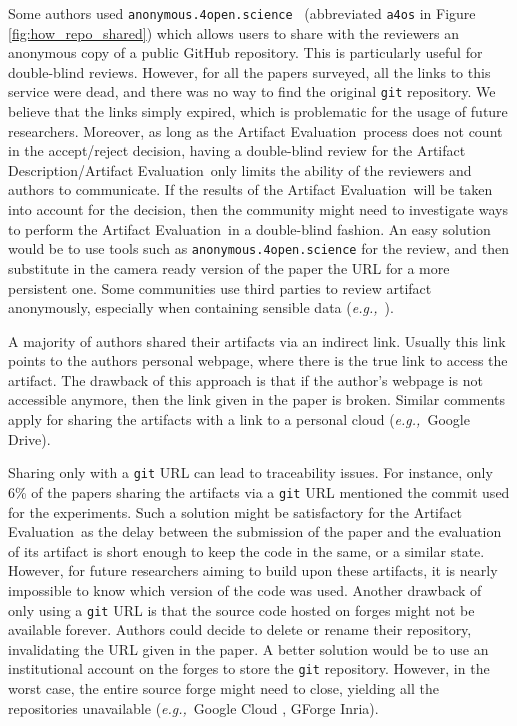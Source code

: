 \documentclass[sigconf,natbib=false]{acmart}
\newcommand{\eg}{\emph{e.g.,}}
\newcommand{\ad}{Artifact Description}
\newcommand{\aeval}{Artifact Evaluation}
\newcommand{\adae}{\ad/\aeval}
\begin{document}
Some authors used \texttt{anonymous.4open.science}\ \cite{anonymous_github} (abbreviated \texttt{a4os} in Figure \ref{fig:how_repo_shared}) which allows users to share with the reviewers an anonymous copy of a public GitHub repository.
This is particularly useful for double-blind reviews.
However, for all the papers surveyed, all the links to this service were dead, and there was no way to find the original \texttt{git} repository.
We believe that the links simply expired, which is problematic for the usage of future researchers.
Moreover, as long as the \aeval\ process does not count in the accept/reject decision, having a double-blind review for the \adae\ only limits the ability of the reviewers and authors to communicate.
If the results of the \aeval\ will be taken into account for the decision, then the community might need to investigate ways to perform the \aeval\ in a double-blind fashion.
An easy solution would be to use tools such as \texttt{anonymous.4open.science} \cite{anonymous_github} for the review, and then substitute in the camera ready version of the paper the URL for a more persistent one.
Some communities use third parties to review artifact anonymously, especially when containing sensible data (\eg\ \cite{perignon2019certify}).

A majority of authors shared their artifacts via an indirect link.
Usually this link points to the authors personal webpage, where there is the true link to access the artifact.
The drawback of this approach is that if the author's webpage is not accessible anymore, then the link given in the paper is broken.
Similar comments apply for sharing the artifacts with a link to a personal cloud (\eg\ Google Drive).

Sharing only with a \texttt{git} URL can lead to traceability issues.
For instance, only 6\% of the papers sharing the artifacts via a \texttt{git} URL mentioned the commit used for the experiments.
Such a solution might be satisfactory for the \aeval\ as the delay between the submission of the paper and the evaluation of its artifact is short enough to keep the code in the same, or a similar state.
However, for future researchers aiming to build upon these artifacts, it is nearly impossible to know which version of the code was used.
Another drawback of only using a \texttt{git} URL is that the source code hosted on forges might not be available forever.
Authors could decide to delete or rename their repository, invalidating the URL given in the paper.
A better solution would be to use an institutional account on the forges to store the \texttt{git} repository.
However, in the worst case, the entire source forge might need to close, yielding all the repositories unavailable (\eg\ Google Cloud \cite{google_code}, GForge Inria).
\end{document}
